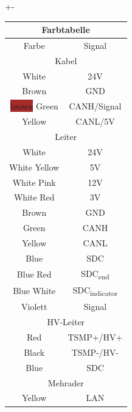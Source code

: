 +-\begin{tabular}{|c|c|}
	\hline
	\multicolumn{2}{|c|}{Farbtabelle} \\
	\hline
	Farbe & Signal \\
	\hline
	\multicolumn{2}{|c|}{Kabel} \\
	\hline
	White & 24V \\
	\hline
	\cellcolor{brown} Brown & GND \\
	\hline
	\colorbox{brown}{brown} Green & CANH/Signal \\
	\hline
	Yellow & CANL/5V \\
	\hline
	\multicolumn{2}{|c|}{Leiter} \\
	\hline
	White & 24V \\
	\hline
	White Yellow & 5V \\
	\hline
	White Pink & 12V \\
	\hline
	White Red & 3V \\
	\hline
	Brown & GND \\
	\hline
	Green & CANH \\
	\hline
	Yellow & CANL \\
	\hline
	Blue & SDC \\
	\hline
	Blue Red & SDC\textsubscript{end} \\
	\hline
	Blue White & SDC\textsubscript{indicator} \\
	\hline
	Violett & Signal \\
	\hline
	\multicolumn{2}{|c|}{HV-Leiter} \\
	\hline
	Red & TSMP+/HV+ \\
	\hline	
	Black & TSMP-/HV- \\
	\hline	
	Blue & SDC \\
	\hline	
	\multicolumn{2}{|c|}{Mehrader} \\
	Yellow & LAN \\
	\hline	
\end{tabular}

